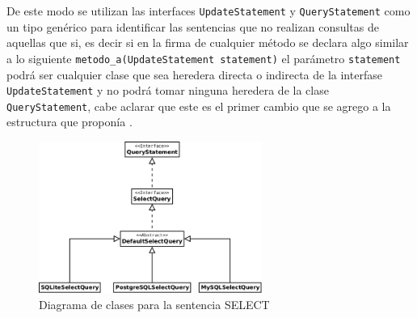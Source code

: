 De este modo se utilizan las interfaces \verb=UpdateStatement= y \verb=QueryStatement= como un tipo genérico para identificar las sentencias que no realizan consultas de aquellas que si, es decir si en la firma de cualquier método se declara algo similar a lo siguiente \verb=metodo_a(UpdateStatement statement)= el parámetro \verb=statement= podrá ser cualquier clase que sea heredera directa o indirecta de la interfase \verb=UpdateStatement= y no podrá tomar ninguna heredera de la clase \verb=QueryStatement=, cabe aclarar que este es el primer cambio que se agrego a la estructura que proponía \cc.
%
\begin{figure}
  \centering
    \includegraphics[width=0.65\textwidth]{figuras/crossdb-query.png}
  \caption{Diagrama de clases para la sentencia SELECT}
  \label{fig:query-base}
\end{figure}

